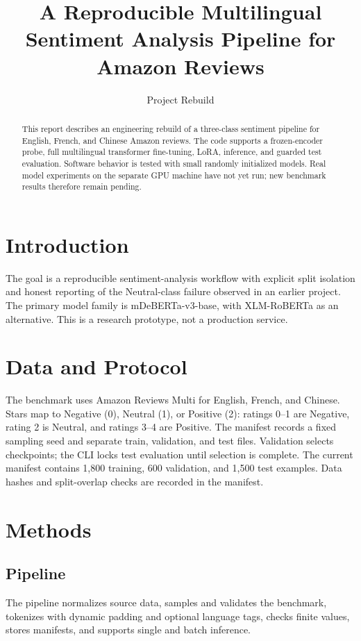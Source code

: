 \documentclass[conference]{IEEEtran}
\title{A Reproducible Multilingual Sentiment Analysis Pipeline for Amazon Reviews}
\author{Project Rebuild}
\begin{document}
\maketitle

\begin{abstract}
This report describes an engineering rebuild of a three-class sentiment pipeline for English,
French, and Chinese Amazon reviews. The code supports a frozen-encoder probe, full multilingual
transformer fine-tuning, LoRA, inference, and guarded test evaluation. Software behavior is
tested with small randomly initialized models. Real model experiments on the separate GPU
machine have not yet run; new benchmark results therefore remain pending.
\end{abstract}

\section{Introduction}
The goal is a reproducible sentiment-analysis workflow with explicit split isolation and honest
reporting of the Neutral-class failure observed in an earlier project. The primary model family
is mDeBERTa-v3-base, with XLM-RoBERTa as an alternative. This is a research prototype, not a
production service.

\section{Data and Protocol}
The benchmark uses Amazon Reviews Multi for English, French, and Chinese. Stars map to
Negative (0), Neutral (1), or Positive (2): ratings 0--1 are Negative, rating 2 is Neutral,
and ratings 3--4 are Positive. The manifest records a fixed sampling seed and separate
train, validation, and test files. Validation selects checkpoints; the CLI locks test
evaluation until selection is complete. The current manifest contains 1,800 training,
600 validation, and 1,500 test examples. Data hashes and split-overlap checks are recorded
in the manifest.

\section{Methods}
\subsection{Pipeline}
The pipeline normalizes source data, samples and validates the benchmark, tokenizes with
dynamic padding and optional language tags, checks finite values, stores manifests, and
supports single and batch inference.
\end{document}
